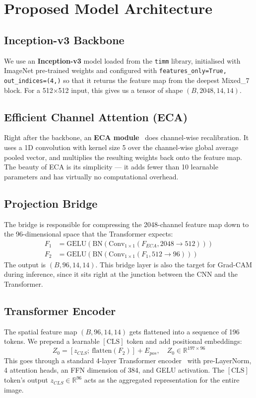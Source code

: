 \documentclass[12pt]{report}
\begin{document}
\section{Proposed Model Architecture}

\subsection{Inception-v3 Backbone}
We use an \textbf{Inception-v3} model loaded from the \texttt{timm} library, initialised with ImageNet pre-trained weights and configured with \texttt{features\_only=True, out\_indices=(4,)} so that it returns the feature map from the deepest Mixed\_7 block. For a 512$\times$512 input, this gives us a tensor of shape $(B, 2048, 14, 14)$.

\subsection{Efficient Channel Attention (ECA)}
Right after the backbone, an \textbf{ECA module}~\cite{ref4} does channel-wise recalibration. It uses a 1D convolution with kernel size 5 over the channel-wise global average pooled vector, and multiplies the resulting weights back onto the feature map. The beauty of ECA is its simplicity --- it adds fewer than 10 learnable parameters and has virtually no computational overhead.

\subsection{Projection Bridge}
The bridge is responsible for compressing the 2048-channel feature map down to the 96-dimensional space that the Transformer expects:
\begin{align}
F_1 &= \text{GELU}(\text{BN}(\text{Conv}_{1\times1}(F_{ECA}, 2048 \to 512))) \\
F_2 &= \text{GELU}(\text{BN}(\text{Conv}_{1\times1}(F_1, 512 \to 96)))
\end{align}
The output is $(B, 96, 14, 14)$. This bridge layer is also the target for Grad-CAM during inference, since it sits right at the junction between the CNN and the Transformer.

\subsection{Transformer Encoder}
The spatial feature map $(B, 96, 14, 14)$ gets flattened into a sequence of 196 tokens. We prepend a learnable $[\text{CLS}]$ token and add positional embeddings:
\begin{equation}
Z_0 = [z_{CLS};\ \text{flatten}(F_2)] + E_{pos}, \quad Z_0 \in \mathbb{R}^{197 \times 96}
\end{equation}
This goes through a standard 4-layer Transformer encoder~\cite{ref15} with pre-LayerNorm, 4 attention heads, an FFN dimension of 384, and GELU activation. The $[\text{CLS}]$ token's output $z_{CLS} \in \mathbb{R}^{96}$ acts as the aggregated representation for the entire image.
\end{document}
